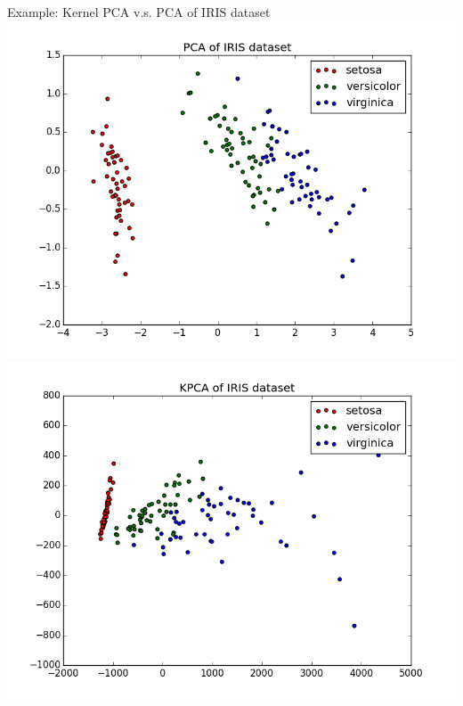 \documentclass[10pt, compress]{beamer}
\begin{document}
\begin{frame}[fragile]{Example: Kernel PCA v.s. PCA of IRIS dataset}
  \includegraphics[width=\textwidth, height=.4\textheight]{images/iris_pca.png} \\
  \includegraphics[width=\textwidth, height=.4\textheight]{images/iris_kpca.png}
\end{frame}
\end{document}
